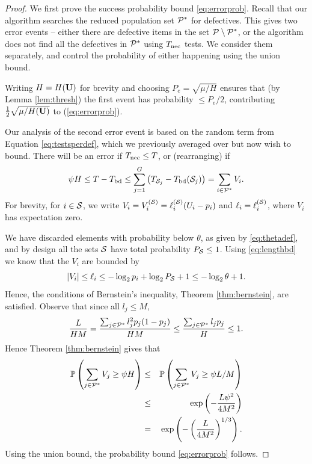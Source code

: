 \begin{proof}
We first prove the success probability bound \eqref{eq:errorprob}.
 Recall that our algorithm searches the reduced population set ${\mathcal{P}}^*$ for defectives.
This gives two  error events -- either there are defective items in the set ${\mathcal{P}} \setminus {\mathcal{P}}^*$, or the algorithm does not find all the defectives in ${\mathcal{P}}^*$ using
$T_{{\rm nec}}$ tests. We consider them separately, and control the probability of either happening using the union bound.

Writing $H = H({\mathbf{ U}})$  for brevity and
choosing $ P_e = \sqrt{ \mu/H }$ ensures that (by Lemma \ref{lem:thresh}) the first event has probability $\leq P_e/2$, contributing 
$\frac{1}{2} \sqrt{ \mu/H({\mathbf{ U}})}$ to (\ref{eq:errorprob}).


Our analysis of the second error event is based on  the 
random term   from
Equation \eqref{eq:testsperdef}, which we previously averaged over but now wish to bound. There will be an error
if $T_{{\rm nec}} \leq T$, or (rearranging) if 
$$\psi H \leq T - T_{{\rm bd}} \leq \sum_{j=1}^G \left(T_{{\mathcal{S}}_j} - T_{{\rm bd}}({\mathcal{S}}_j) \right) = \sum_{i \in {\mathcal{P}}^*} V_i.$$  For brevity,   for $i \in {\mathcal{S}}$, we write 
$V_i = V_ i^{({\mathcal{S}})} = \ell_i^{({\mathcal{S}})} (U_i - p_i)$ and $\ell_i = \ell_i^{({\mathcal{S}})}$, where $V_i$ has expectation zero. 

We have discarded elements with probability below $\theta$, as given by \eqref{eq:thetadef}, and by design all the sets ${\mathcal{S}}$ have total probability $P_{{\mathcal{S}}} \leq 1$. Using
 \eqref{eq:lengthbd} we know that the $V_i$ are bounded by
\begin{equation} | V_i|  \leq \ell_i \leq -\log_2 p_i + \log_2 P_{{\mathcal{S}}} + 1 \leq - \log_2 \theta + 1. \label{eq:vbd} \end{equation}
Hence, the conditions of Bernstein's inequality, Theorem \ref{thm:bernstein}, are satisfied. 
Observe that since all $l_j \leq M$,
$$ \frac{ L}{H M} = \frac{ \sum_{j \in {\mathcal{P}}^*} l_j^2 p_j (1-p_j)} { H M} \leq \frac{ \sum_{j \in {\mathcal{P}}^*} l_j p_j } { H} \leq 1 .$$
Hence Theorem \ref{thm:bernstein} gives that 
\begin{eqnarray*}
 {\mathbb{P}} \left( \sum_{j \in {\mathcal{P}}^*} V_j \geq \psi H \right) 
& \leq &
 {\mathbb{P}} \left( \sum_{j \in {\mathcal{P}}^*} V_j \geq \psi L/M \right) \\
& \leq &  \exp \left( - \frac{L \psi^2}{4  M^2 } \right) \\ 
& = & \exp \left( - \left( \frac{L}{4  M^2 }  \right)^{1/3}
\right).
\end{eqnarray*}
Using the union bound, the probability bound \eqref{eq:errorprob} follows.


\end{proof}
